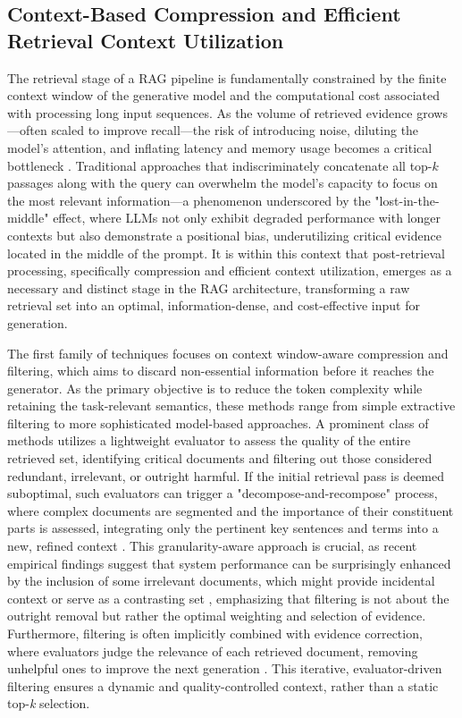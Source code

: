\documentclass[11pt,a4paper]{article}
\begin{document}
\subsection{Context-Based Compression and Efficient Retrieval Context Utilization}


The retrieval stage of a RAG pipeline is fundamentally constrained by the finite context window of the generative model and the computational cost associated with processing long input sequences. As the volume of retrieved evidence grows---often scaled to improve recall---the risk of introducing noise, diluting the model's attention, and inflating latency and memory usage becomes a critical bottleneck \cite{arxiv:2401.14887v3}. Traditional approaches that indiscriminately concatenate all top-\(k\) passages along with the query can overwhelm the model's capacity to focus on the most relevant information---a phenomenon underscored by the "lost-in-the-middle" effect, where LLMs not only exhibit degraded performance with longer contexts but also demonstrate a positional bias, underutilizing critical evidence located in the middle of the prompt. It is within this context that post-retrieval processing, specifically compression and efficient context utilization, emerges as a necessary and distinct stage in the RAG architecture, transforming a raw retrieval set into an optimal, information-dense, and cost-effective input for generation.

The first family of techniques focuses on context window-aware compression and filtering, which aims to discard non-essential information before it reaches the generator. As the primary objective is to reduce the token complexity while retaining the task-relevant semantics, these methods range from simple extractive filtering to more sophisticated model-based approaches. A prominent class of methods utilizes a lightweight evaluator to assess the quality of the entire retrieved set, identifying critical documents and filtering out those considered redundant, irrelevant, or outright harmful. If the initial retrieval pass is deemed suboptimal, such evaluators can trigger a "decompose-and-recompose" process, where complex documents are segmented and the importance of their constituent parts is assessed, integrating only the pertinent key sentences and terms into a new, refined context \cite{arxiv:2401.14887v3}. This granularity-aware approach is crucial, as recent empirical findings suggest that system performance can be surprisingly enhanced by the inclusion of some irrelevant documents, which might provide incidental context or serve as a contrasting set \cite{arxiv:2401.14887v3}, emphasizing that filtering is not about the outright removal but rather the optimal weighting and selection of evidence. Furthermore, filtering is often implicitly combined with evidence correction, where evaluators judge the relevance of each retrieved document, removing unhelpful ones to improve the next generation \cite{arxiv:2310.11511v1}. This iterative, evaluator-driven filtering ensures a dynamic and quality-controlled context, rather than a static top-\emph{k} selection.
\end{document}
